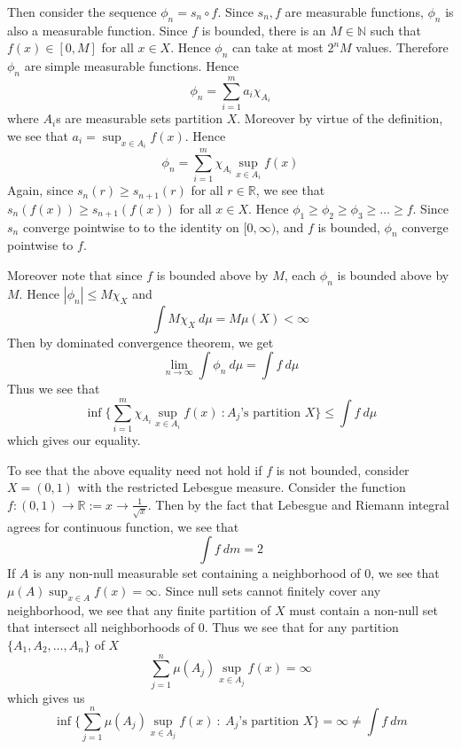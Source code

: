 \documentclass[12pt]{exam}
\theoremstyle{plain} %
\theoremstyle{definition} %
\theoremstyle{remark} %
\begin{document}
\begin{questions}
\begin{solution}
    Then consider the sequence $\phi_n = s_{n} \circ
    f$. Since $s_n, f$ are measurable functions, $\phi_n$ is also a
    measurable function. Since $f$ is bounded, there is an
    $M \in \mathbb{N}$ such that $f(x) \in [0, M]$ for all $x \in X$.
    Hence $\phi_n$ can take at most $2^n M$ values. Therefore
    $\phi_n$ are simple measurable functions. Hence \[
      \phi_n  = \sum_{i = 1}^{m} a_i \chi_{A_i}
    \]
    where $A_i$s are measurable sets partition $X$.
    Moreover by virtue of the definition, we see that $a_i = \sup_{x
    \in A_i}f(x)$. Hence \[
      \phi_n = \sum_{i = 1}^{m} \chi_{A_i} \sup_{x \in A_i}f(x)
    \]
    Again, since $s_n(r) \ge s_{n+1}(r)$ for all $r \in
    \mathbb{R}$, we see that
    $s_n(f(x)) \ge s_{n+1}(f(x))$ for all $x \in X$. Hence $\phi_1
    \ge \phi_2 \ge \phi_3  \ge \ldots \ge f$. Since $s_n$ converge
    pointwise to to the identity on $[0, \infty)$, and $f$ is
    bounded,  $\phi_n$ converge pointwise to $f$.

    Moreover note that since $f$ is bounded above by $M$, each
    $\phi_n$ is bounded above by $M$. Hence $|\phi_n| \le M\chi_X$ and \[
      \int M \chi_X  \ d \mu = M \mu(X) < \infty
    \]
    Then by dominated convergence theorem, we get \[
      \lim_{n \to \infty} \int \phi_n \ d  \mu = \int  f \ d \mu
    \]
    Thus we see that \[
      \inf \Bigg\{ \sum_{i = 1}^{m} \chi_{A_i} \sup_{ x \in A_i}f(x)
        \ : A_j \textrm{'s partition } X
      \Bigg\} \le \int f \ d \mu
    \]
    which gives our equality.

    To see that the above equality need not hold if $f$ is not
    bounded, consider $X = (0, 1)$ with the restricted Lebesgue
    measure. Consider the function $f: (0, 1) \to \mathbb{R}:= x \to
    \frac{1}{\sqrt{x}}$. Then by the fact that Lebesgue and Riemann
    integral agrees for continuous function, we see that \[
      \int  f \ d m = 2
    \]
    If $A$ is any non-null measurable set containing a neighborhood
    of $0$, we see that $\mu(A)\sup_{x \in A}f(x) = \infty$. Since null
    sets cannot finitely cover any neighborhood, we see that any
    finite partition of
    $X$ must contain a non-null set that intersect all neighborhoods
    of $0$. Thus we see that for any partition $\{ A_1 , A_2 , \ldots
    , A_n \}$ of $X$ \[
      \sum_{j = 1}^{n} \mu(A_j) \sup_{ x \in A_j}f(x) = \infty
    \]
    which gives us
    \[
      \inf \Bigg\{ \sum_{j = 1}^{n} \mu(A_j)
        \sup_{ x \in A_j} f(x)\ : \ A_j \textrm{'s partition }  X
      \Bigg\} = \infty \neq \int  f \ d m
    \]
  \end{solution}


\end{questions}
\end{document}
